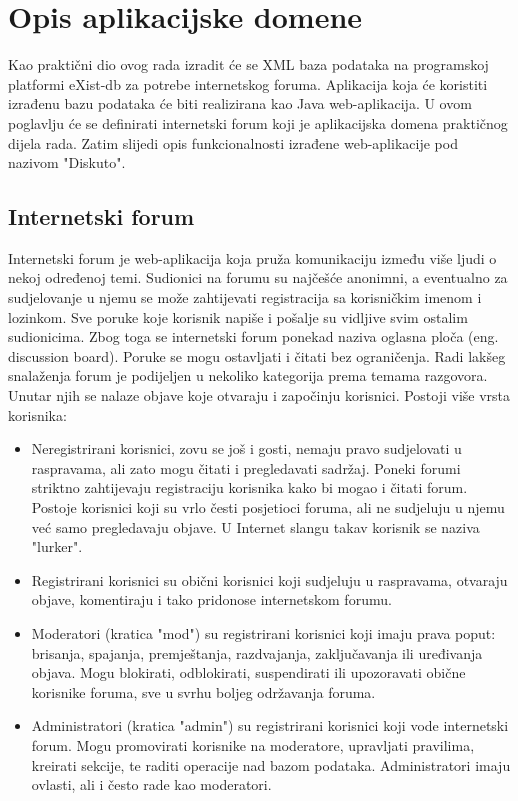 \documentclass{foi}
\begin{document}
\lipsum[1]

\chapter{Opis aplikacijske domene}

Kao praktični dio ovog rada izradit će se XML baza podataka na programskoj platformi eXist-db za potrebe internetskog foruma. Aplikacija koja će koristiti izrađenu bazu podataka će biti realizirana kao Java web-aplikacija. U ovom poglavlju će se definirati internetski forum koji je aplikacijska domena praktičnog dijela rada. Zatim slijedi opis funkcionalnosti izrađene web-aplikacije pod nazivom "Diskuto".

\section{Internetski forum}

Internetski forum je web-aplikacija koja pruža komunikaciju između više ljudi o nekoj određenoj temi. Sudionici na forumu su najčešće anonimni, a eventualno za sudjelovanje u njemu se može zahtijevati registracija sa korisničkim imenom i lozinkom.  Sve poruke koje korisnik napiše i pošalje su vidljive svim ostalim sudionicima. \cite{definitionInternetForum} Zbog toga se internetski forum ponekad naziva oglasna ploča (eng. discussion board). Poruke se mogu ostavljati i čitati bez ograničenja. Radi lakšeg snalaženja forum je podijeljen u nekoliko kategorija prema temama razgovora. Unutar njih se nalaze objave koje otvaraju i započinju korisnici. Postoji više vrsta korisnika:

\begin{itemize}
\item Neregistrirani korisnici, zovu se još i gosti, nemaju pravo sudjelovati u raspravama, ali zato mogu čitati i pregledavati sadržaj. Poneki forumi striktno zahtijevaju registraciju korisnika kako bi mogao i čitati forum. Postoje korisnici koji su vrlo česti posjetioci foruma, ali ne sudjeluju u njemu već samo pregledavaju objave. U Internet slangu takav korisnik se naziva "lurker".\cite{lurker}
\item Registrirani korisnici su obični korisnici koji sudjeluju u raspravama, otvaraju objave, komentiraju i tako pridonose internetskom forumu.
\item Moderatori (kratica "mod") su registrirani korisnici koji imaju prava poput: brisanja, spajanja, premještanja, razdvajanja, zaključavanja ili uređivanja objava. Mogu blokirati, odblokirati, suspendirati ili upozoravati obične korisnike foruma, sve u svrhu boljeg održavanja foruma.
\item Administratori (kratica "admin") su registrirani korisnici koji vode internetski forum. Mogu promovirati korisnike na moderatore, upravljati pravilima, kreirati sekcije, te raditi operacije nad bazom podataka. Administratori imaju ovlasti, ali i često rade kao moderatori.\cite{adminvsmoderator}
\end{itemize}
\end{document}

